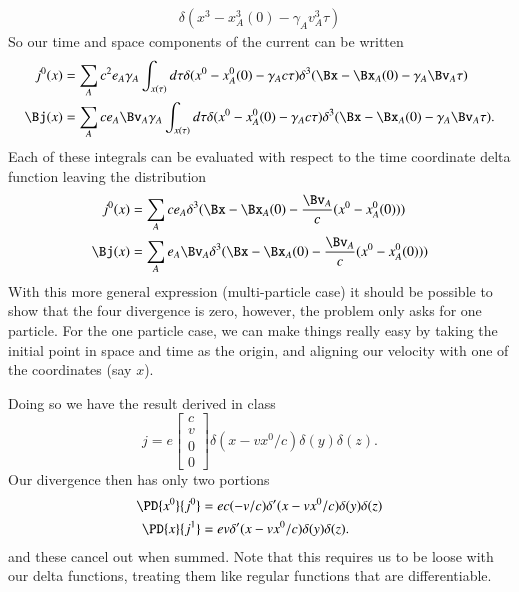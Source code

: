 {\begin{equation}
\begin{aligned}
\delta(x^3 - x_A^3(0) - \gamma_A v_A^3 \tau)
\end{aligned}
\end{equation}
%
So our time and space components of the current can be written
%
\begin{equation}\label{eqn:relElectroDynProblemSet3:2000}
\begin{aligned}
j^0(x) &= \sum_A c^2 e_A \gamma_A \int_{x(\tau)} d\tau
\delta(x^0 - x_A^0(0) - \gamma_A c \tau)
\delta^3(\Bx - \Bx_A(0) - \gamma_A \Bv_A \tau) \\
\Bj(x) &= \sum_A c e_A \Bv_A \gamma_A \int_{x(\tau)} d\tau
\delta(x^0 - x_A^0(0) - \gamma_A c \tau)
\delta^3(\Bx - \Bx_A(0) - \gamma_A \Bv_A \tau).
\end{aligned}
\end{equation}
%
Each of these integrals can be evaluated with respect to the time coordinate delta function leaving the distribution
%
\begin{equation}\label{eqn:relElectroDynProblemSet3:2020}
\begin{aligned}
j^0(x) &= \sum_A c e_A
\delta^3(\Bx - \Bx_A(0) - \frac{\Bv_A}{c} (x^0 - x_A^0(0))) \\
\Bj(x) &= \sum_A e_A \Bv_A
\delta^3(\Bx - \Bx_A(0) - \frac{\Bv_A}{c} (x^0 - x_A^0(0)))
\end{aligned}
\end{equation}
%
With this more general expression (multi-particle case) it should be possible to show that the four divergence is zero, however, the problem only asks for one particle.  For the one particle case, we can make things really easy by taking the initial point in space and time as the origin, and aligning our velocity with one of the coordinates (say \(x\)).

Doing so we have the result derived in class
%
\begin{equation}\label{eqn:relElectroDynProblemSet3:2040}
j = e
\begin{bmatrix}
c \\
v \\
0 \\
0
\end{bmatrix}
\delta(x - v x^0/c)
\delta(y)
\delta(z).
\end{equation}
%
Our divergence then has only two portions
%
\begin{equation}\label{eqn:relElectroDynProblemSet3:2060}
\begin{aligned}
\PD{x^0}{j^0} &= e c (-v/c) \delta'(x - v x^0/c) \delta(y) \delta(z) \\
\PD{x}{j^1} &= e v \delta'(x - v x^0/c) \delta(y) \delta(z).
\end{aligned}
\end{equation}
%
and these cancel out when summed.  Note that this requires us to be loose with our delta functions, treating them like regular functions that are differentiable.

}
